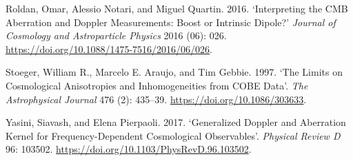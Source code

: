 \documentclass[
  11pt,
  a4paper]{article}
\newlength{\cslhangindent}
\newlength{\cslentryspacingunit} %
\newenvironment{CSLReferences}[2] %
 {%
  \setlength{\parindent}{0pt}
  \ifodd #1
  \let\oldpar\par
  \def\par{\hangindent=\cslhangindent\oldpar}
  \fi
  \setlength{\parskip}{#2\cslentryspacingunit}
 }%
 {}
\begin{document}
\begin{CSLReferences}{1}{0}
\leavevmode{}%
Roldan, Omar, Alessio Notari, and Miguel Quartin. 2016. {`Interpreting the {CMB} Aberration and Doppler Measurements: Boost or Intrinsic Dipole?'} \emph{Journal of Cosmology and Astroparticle Physics} 2016 (06): 026. \url{https://doi.org/10.1088/1475-7516/2016/06/026}.

\leavevmode{}%
Stoeger, William R., Marcelo E. Araujo, and Tim Gebbie. 1997. {`The Limits on Cosmological Anisotropies and Inhomogeneities from {COBE} Data'}. \emph{The Astrophysical Journal} 476 (2): 435--39. \url{https://doi.org/10.1086/303633}.

\leavevmode{}%
Yasini, Siavash, and Elena Pierpaoli. 2017. {`Generalized Doppler and Aberration Kernel for Frequency-Dependent Cosmological Observables'}. \emph{Physical Review D} 96: 103502. \url{https://doi.org/10.1103/PhysRevD.96.103502}.

\end{CSLReferences}
\end{document}
